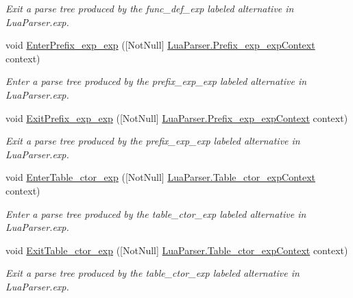 \begin{DoxyCompactItemize}
\begin{DoxyCompactList}\small\item\em Exit a parse tree produced by the {\ttfamily func\+\_\+def\+\_\+exp} labeled alternative in Lua\+Parser.\+exp. \end{DoxyCompactList}\item 
void \mbox{\hyperlink{interfacezlua_1_1_i_lua_listener_a4b07c7ca53f3650fc8b83891467f7a66}{Enter\+Prefix\+\_\+exp\+\_\+exp}} (\mbox{[}Not\+Null\mbox{]} \mbox{\hyperlink{classzlua_1_1_lua_parser_1_1_prefix__exp__exp_context}{Lua\+Parser.\+Prefix\+\_\+exp\+\_\+exp\+Context}} context)
\begin{DoxyCompactList}\small\item\em Enter a parse tree produced by the {\ttfamily prefix\+\_\+exp\+\_\+exp} labeled alternative in Lua\+Parser.\+exp. \end{DoxyCompactList}\item 
void \mbox{\hyperlink{interfacezlua_1_1_i_lua_listener_a88094687ca2271e4cbef04c18a738b99}{Exit\+Prefix\+\_\+exp\+\_\+exp}} (\mbox{[}Not\+Null\mbox{]} \mbox{\hyperlink{classzlua_1_1_lua_parser_1_1_prefix__exp__exp_context}{Lua\+Parser.\+Prefix\+\_\+exp\+\_\+exp\+Context}} context)
\begin{DoxyCompactList}\small\item\em Exit a parse tree produced by the {\ttfamily prefix\+\_\+exp\+\_\+exp} labeled alternative in Lua\+Parser.\+exp. \end{DoxyCompactList}\item 
void \mbox{\hyperlink{interfacezlua_1_1_i_lua_listener_a8f36bb02f3d3923600ba29606adf1db4}{Enter\+Table\+\_\+ctor\+\_\+exp}} (\mbox{[}Not\+Null\mbox{]} \mbox{\hyperlink{classzlua_1_1_lua_parser_1_1_table__ctor__exp_context}{Lua\+Parser.\+Table\+\_\+ctor\+\_\+exp\+Context}} context)
\begin{DoxyCompactList}\small\item\em Enter a parse tree produced by the {\ttfamily table\+\_\+ctor\+\_\+exp} labeled alternative in Lua\+Parser.\+exp. \end{DoxyCompactList}\item 
void \mbox{\hyperlink{interfacezlua_1_1_i_lua_listener_a30a4acd429120b15838dc24ddb201fc6}{Exit\+Table\+\_\+ctor\+\_\+exp}} (\mbox{[}Not\+Null\mbox{]} \mbox{\hyperlink{classzlua_1_1_lua_parser_1_1_table__ctor__exp_context}{Lua\+Parser.\+Table\+\_\+ctor\+\_\+exp\+Context}} context)
\begin{DoxyCompactList}\small\item\em Exit a parse tree produced by the {\ttfamily table\+\_\+ctor\+\_\+exp} labeled alternative in Lua\+Parser.\+exp. \end{DoxyCompactList}\item 

\end{DoxyCompactItemize}
